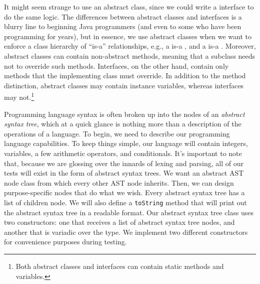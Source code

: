 It might seem strange to use an abstract class, since we could write a  interface to do the same logic. The differences between abstract classes and interfaces is a blurry line to beginning Java programmers (and even to some who have been programming for years), but in essence, we use abstract classes when we want to enforce a class hierarchy of ``is-a'' relationships, e.g., a  is-a , and a  is-a . Moreover, abstract classes can contain non-abstract methods, meaning that a subclass needs not to override such methods. Interfaces, on the other hand, contain only methods that the implementing class must override. In addition to the method distinction, abstract classes may contain instance variables, whereas interfaces may not.\footnote{Both abstract classes and interfaces can contain static methods and variables.}


Programming language syntax is often broken up into the nodes of an \textit{abstract syntax tree}, which at a quick glance is nothing more than a description of the operations of a language. To begin, we need to describe our programming language capabilities. To keep things simple, our language will contain integers, variables, a few arithmetic operators, and conditionals. It's important to note that, because we are glossing over the innards of lexing and  parsing, all of our tests will exist in the form of abstract syntax trees. We want an abstract AST node class from which every other AST node inherits. Then, we can design purpose-specific nodes that do what we wish. Every abstract syntax tree has a list of children node. We will also define a \texttt{toString} method that will print out the abstract syntax tree in a readable format. Our abstract syntax tree class uses two constructors: one that receives a list of abstract syntax tree nodes, and another that is variadic over the  type. We implement two different constructors for convenience purposes during testing.

